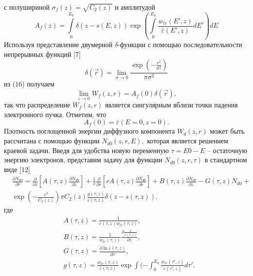 с полушириной $\sigma_f(z)=\sqrt{C_2 (z)}$ и амплитудой
\begin{equation}
A_f(z) = \int\limits_0^{E_0}\delta( z − s(E, z))\exp\left(\int\limits_0^{E_0}\frac{w_{tr} ( E′, z)}{\bar{\varepsilon}(E′, z)}dE′\right) dE
\end{equation}
Используя представление двумерной \(\delta\)-функции с помощью последовательности непрерывных функций [7]
\begin{equation}
\delta(\vec{r}) = \lim_{\sigma\rightarrow0} \frac{\exp\left(−\frac{r^2}{\sigma^2}\right)}{\pi\sigma^2}
\end{equation}
из (16) получаем
\begin{equation}
\lim_{z\rightarrow0} W_f(z, r) = A_f(0)\delta(\vec{r}),
\end{equation}
так что распределение \( W_f(z, r) \) является сингулярным вблизи точки падения
электронного пучка. Отметим, что
\begin{equation}
    A_f(0) = \bar{\varepsilon}(E=0, z=0).    
\end{equation}
Плотность поглощенной энергии диффузного компонента \(W_d(z, r)\) может быть
рассчитана с помощью функции \(N_{d0}(z, r, E),\) которая является решением краевой задачи.
Введя для удобства новую переменную \(\tau=E0-E\) -- остаточную энергию электронов,
представим задачу для функции \(N_{d0}(z, r, \tau)\) в стандартном виде [12]
\begin{align}
& \frac{\partial N_{d0}}{\partial\tau} = \frac{\partial}{\partial z}\left[A (\tau , z )\frac{\partial N_{d0}}{\partial z}\right]
+ \frac{1}{r}\frac{\partial}{\partial r}\left[rA(\tau, z)
\frac{\partial N_{d0}}{\partial r}\right] + B (\tau , z )
\frac{\partial N_{d0}}{\partial z} − G (\tau , z )N_{d0}
+ \\
& \exp\left( −\frac{r^2}{C_2(z)}\right)\pi C_2(z)\frac{g(\tau, z)}{\bar{\varepsilon} (\tau , z ) }\delta ( z − s(\tau , z )).
\nonumber
\end{align}
где
\begin{align}
& A (\tau, z) = \frac{1}{\bar{\varepsilon}(\tau, z)w_{tr} (\tau, z)}, \\
& B (\tau, z) = \frac{1}{w_{tr}(\tau, z)}\frac{\partial\frac{1}{\bar{\varepsilon}(\tau, z)}}{\partial z}, \\
& G (\tau, z) = \frac{\partial\ln\bar{\varepsilon}(\tau, z )}{\partial\tau},\\
& g(\tau, z) = \frac{w_{tr}(\tau , z )}{\bar{\varepsilon} (\tau , z )}\exp\int( −\int_0^{E_0} \frac{w_{tr}(\tau′, z )}{\bar{\varepsilon} (\tau′, z)}d\tau′.    
\end{align}

